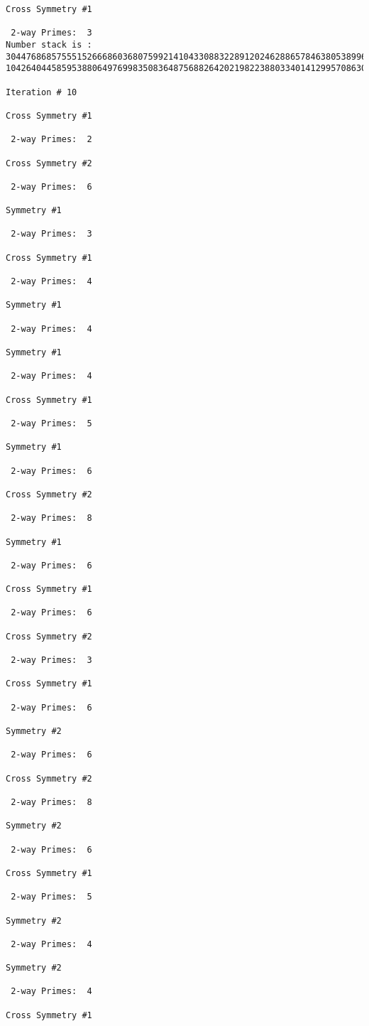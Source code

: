 {{{{\begin{verbatim}
Cross Symmetry #1

 2-way Primes: 	3
Number stack is :
30447686857555152666860368075992141043308832289120246288657846380538996794608835958544046240163340857
10426404458595388064976998350836487568826420219822388033401412995708630686662515557586867440375804336

Iteration #	10

Cross Symmetry #1

 2-way Primes: 	2

Cross Symmetry #2

 2-way Primes: 	6

Symmetry #1

 2-way Primes: 	3

Cross Symmetry #1

 2-way Primes: 	4

Symmetry #1

 2-way Primes: 	4

Symmetry #1

 2-way Primes: 	4

Cross Symmetry #1

 2-way Primes: 	5

Symmetry #1

 2-way Primes: 	6

Cross Symmetry #2

 2-way Primes: 	8

Symmetry #1

 2-way Primes: 	6

Cross Symmetry #1

 2-way Primes: 	6

Cross Symmetry #2

 2-way Primes: 	3

Cross Symmetry #1

 2-way Primes: 	6

Symmetry #2

 2-way Primes: 	6

Cross Symmetry #2

 2-way Primes: 	8

Symmetry #2

 2-way Primes: 	6

Cross Symmetry #1

 2-way Primes: 	5

Symmetry #2

 2-way Primes: 	4

Symmetry #2

 2-way Primes: 	4

Cross Symmetry #1


\end{verbatim}}}}}
